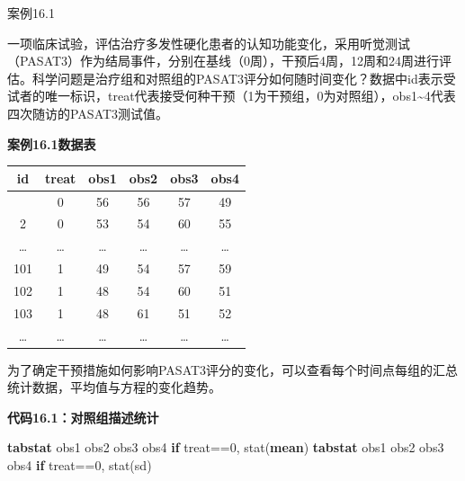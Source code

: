\documentclass[
  chinese-hans,
  letterpaper,
  DIV=11,
  numbers=noendperiod]{scrreprt}
\newenvironment{Shaded}{\begin{snugshade}}{\end{snugshade}}
\newcommand{\FunctionTok}[1]{\textcolor[rgb]{0.28,0.35,0.67}{#1}}
\newcommand{\KeywordTok}[1]{\textcolor[rgb]{0.00,0.23,0.31}{\textbf{#1}}}
\newcommand{\NormalTok}[1]{\textcolor[rgb]{0.00,0.23,0.31}{#1}}
\newcounter{none} %
\begin{document}
案例16.1

一项临床试验，评估治疗多发性硬化患者的认知功能变化，采用听觉测试（PASAT3）作为结局事件，分别在基线（0周），干预后4周，12周和24周进行评估。科学问题是治疗组和对照组的PASAT3评分如何随时间变化？数据中id表示受试者的唯一标识，treat代表接受何种干预（1为干预组，0为对照组），obs1\textasciitilde4代表四次随访的PASAT3测试值。

\textbf{案例16.1数据表}

{\def\LTcaptype{none} %
\begin{longtable}[]{@{}cccccc@{}}
\toprule\noalign{}
id & treat & obs1 & obs2 & obs3 & obs4 \\
\midrule\noalign{}
\endhead
\bottomrule\noalign{}
\endlastfoot
1 & 0 & 56 & 56 & 57 & 49 \\
2 & 0 & 53 & 54 & 60 & 55 \\
\ldots{} & \ldots{} & \ldots{} & \ldots{} & \ldots{} & \ldots{} \\
101 & 1 & 49 & 54 & 57 & 59 \\
102 & 1 & 48 & 54 & 60 & 51 \\
103 & 1 & 48 & 61 & 51 & 52 \\
\ldots{} & \ldots{} & \ldots{} & \ldots{} & \ldots{} & \ldots{} \\
\end{longtable}
}

为了确定干预措施如何影响PASAT3评分的变化，可以查看每个时间点每组的汇总统计数据，平均值与方程的变化趋势。

\begin{tcolorbox}[enhanced jigsaw, arc=.35mm, bottomrule=.15mm, breakable, colback=white, colframe=quarto-callout-note-color-frame, left=2mm, leftrule=.75mm, opacityback=0, rightrule=.15mm, toprule=.15mm]

\vspace{-3mm}\textbf{代码16.1：对照组描述统计}\vspace{3mm}

\begin{Shaded}
\begin{Highlighting}[]
\KeywordTok{tabstat}\NormalTok{ obs1 obs2 obs3 obs4 }\KeywordTok{if}\NormalTok{ treat==0, stat(}\KeywordTok{mean}\NormalTok{)}
\KeywordTok{tabstat}\NormalTok{ obs1 obs2 obs3 obs4 }\KeywordTok{if}\NormalTok{ treat==0, stat(}\FunctionTok{sd}\NormalTok{)}
\end{Highlighting}
\end{Shaded}

\end{tcolorbox}
\end{document}

